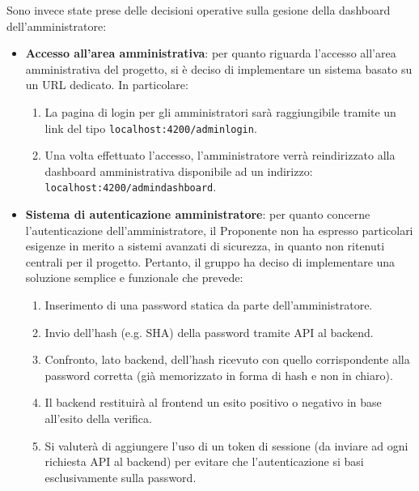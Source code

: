 Sono invece state prese delle decisioni operative sulla gesione della dashboard dell'amministratore:
\begin{itemize}
    \item \textbf{Accesso all'area amministrativa}: per quanto riguarda l'accesso all'area amministrativa del progetto, si è deciso di implementare un sistema basato su un URL dedicato. In particolare:
\begin{enumerate}
    \item La pagina di login per gli amministratori sarà raggiungibile tramite un link del tipo \texttt{localhost:4200/adminlogin}.
    \item Una volta effettuato l'accesso, l'amministratore verrà reindirizzato alla dashboard amministrativa disponibile ad un indirizzo: \texttt{localhost:4200/admindash\newline board}.
\end{enumerate}
\item \textbf{Sistema di autenticazione amministratore}: per quanto concerne l'autenticazione dell'amministratore, il Proponente non ha espresso particolari esigenze in merito a sistemi avanzati di sicurezza, in quanto non ritenuti centrali per il progetto. Pertanto, il gruppo ha deciso di implementare una soluzione semplice e funzionale che prevede:
\begin{enumerate}
    \item Inserimento di una password statica da parte dell'amministratore.
    \item Invio dell'hash (e.g. SHA) della password tramite API al backend.
    \item Confronto, lato backend, dell'hash ricevuto con quello corrispondente alla password corretta (già memorizzato in forma di hash e non in chiaro).
    \item Il backend restituirà al frontend un esito positivo o negativo in base all'esito della verifica.
    \item Si valuterà di aggiungere l'uso di un token di sessione (da inviare ad ogni richiesta API al backend) per evitare che l'autenticazione si basi esclusivamente sulla password. 
\end{enumerate}
\end{itemize}
